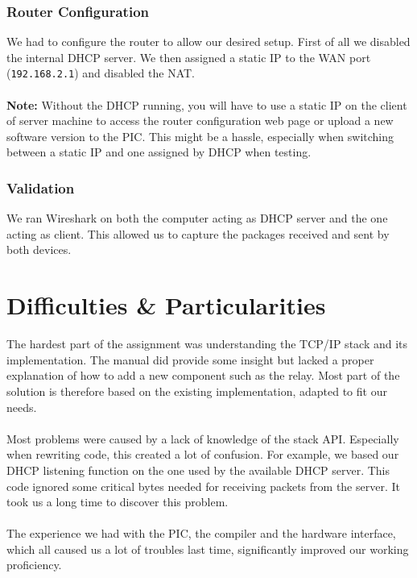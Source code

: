 \documentclass[11pt]{article}
\begin{document}
\subsubsection{Router Configuration}
We had to configure the router to allow our desired setup. First of all we
disabled the internal DHCP server. We then assigned a static IP to the WAN port
(\texttt{192.168.2.1}) and disabled the NAT. \\
\\
\textbf{Note:} Without the DHCP running, you will have to use a static IP on the
client of server machine to access the router configuration web page or upload a
new software version to the PIC. This might be a hassle, especially when
switching between a static IP and one assigned by DHCP when testing.

\subsubsection{Validation}
We ran Wireshark on both the computer acting as DHCP server and the one acting
as client. This allowed us to capture the packages received and sent by both
devices.

\section{Difficulties \& Particularities}
The hardest part of the assignment was understanding the TCP/IP stack and its
implementation. The manual did provide some insight but lacked a proper
explanation of how to add a new component such as the relay. Most part of the
solution is therefore based on the existing implementation, adapted to fit our
needs.
\\\\
Most problems were caused by a lack of knowledge of the stack API. Especially
when rewriting code, this created a lot of confusion. For example, we based our
DHCP listening function on the one used by the available DHCP server. This code
ignored some critical bytes needed for receiving packets from the server. It
took us a long time to discover this problem.
\\\\
The experience we had with the PIC, the compiler and the hardware interface,
which all caused us a lot of troubles last time, significantly improved our
working proficiency.
\end{document}

